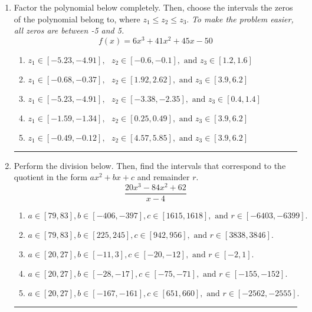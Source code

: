 \documentclass[14pt]{extbook}
\newcommand{\litem}[1]{\item#1\hspace*{-1cm}\rule{\textwidth}{0.4pt}}
\begin{document}
\begin{enumerate}
{\begin{enumerate}[label=\Alph*.]
\end{enumerate} }
\litem{
Factor the polynomial below completely. Then, choose the intervals the zeros of the polynomial belong to, where $z_1 \leq z_2 \leq z_3$. \textit{To make the problem easier, all zeros are between -5 and 5.}\[ f(x) = 6x^{3} +41 x^{2} +45 x -50 \]\begin{enumerate}[label=\Alph*.]
\item \( z_1 \in [-5.23, -4.91], \text{   }  z_2 \in [-0.6, -0.1], \text{   and   } z_3 \in [1.2, 1.6] \)
\item \( z_1 \in [-0.68, -0.37], \text{   }  z_2 \in [1.92, 2.62], \text{   and   } z_3 \in [3.9, 6.2] \)
\item \( z_1 \in [-5.23, -4.91], \text{   }  z_2 \in [-3.38, -2.35], \text{   and   } z_3 \in [0.4, 1.4] \)
\item \( z_1 \in [-1.59, -1.34], \text{   }  z_2 \in [0.25, 0.49], \text{   and   } z_3 \in [3.9, 6.2] \)
\item \( z_1 \in [-0.49, -0.12], \text{   }  z_2 \in [4.57, 5.85], \text{   and   } z_3 \in [3.9, 6.2] \)

\end{enumerate} }
\litem{
Perform the division below. Then, find the intervals that correspond to the quotient in the form $ax^2+bx+c$ and remainder $r$.\[ \frac{20x^{3} -84 x^{2} + 62}{x -4} \]\begin{enumerate}[label=\Alph*.]
\item \( a \in [79, 83], b \in [-406, -397], c \in [1615, 1618], \text{ and } r \in [-6403, -6399]. \)
\item \( a \in [79, 83], b \in [225, 245], c \in [942, 956], \text{ and } r \in [3838, 3846]. \)
\item \( a \in [20, 27], b \in [-11, 3], c \in [-20, -12], \text{ and } r \in [-2, 1]. \)
\item \( a \in [20, 27], b \in [-28, -17], c \in [-75, -71], \text{ and } r \in [-155, -152]. \)
\item \( a \in [20, 27], b \in [-167, -161], c \in [651, 660], \text{ and } r \in [-2562, -2555]. \)


\end{enumerate}}
\end{enumerate}
\end{document}
